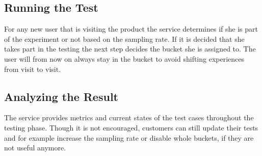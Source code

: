 \documentclass[main.tex]{subfiles}
\begin{document}
\subsection{Running the Test}
For any new user that is visiting the product the service determines if she is part of the experiment or not based on the sampling rate. If it is decided that she takes part in the testing the next step decides the bucket she is assigned to. The user will from now on always stay in the bucket to avoid shifting experiences from visit to visit.
\subsection{Analyzing the Result}
The service provides metrics and current states of the test cases throughout the testing phase. Though it is not encouraged, customers can still update their tests and for example increase the sampling rate or disable whole buckets, if they are not useful anymore.
\end{document}
